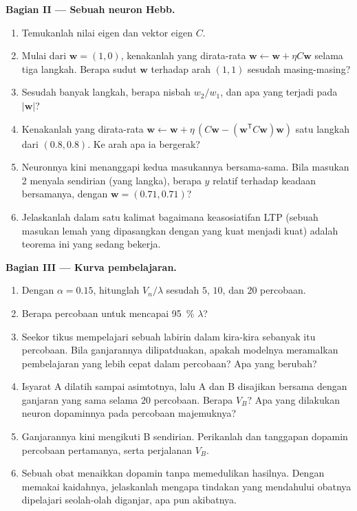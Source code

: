 \begin{problem}
\medskip
\noindent\textbf{Bagian II --- Sebuah neuron Hebb.}
\begin{enumerate}[resume]
  \item Temukanlah nilai eigen dan vektor eigen $C$.
  \item Mulai dari $\mathbf{w} = (1, 0)$, kenakanlah  yang dirata-rata
        $\mathbf{w} \leftarrow \mathbf{w} + \eta C\mathbf{w}$ selama
        tiga langkah. Berapa sudut $\mathbf{w}$ terhadap arah $(1,1)$
        sesudah masing-masing?
  \item Sesudah banyak langkah, berapa nisbah $w_{2}/w_{1}$, dan apa yang
        terjadi pada $|\mathbf{w}|$?
  \item Kenakanlah  yang dirata-rata $\mathbf{w} \leftarrow \mathbf{w} +
        \eta\,(C\mathbf{w} - (\mathbf{w}^{\mathsf{T}}C\mathbf{w})
        \mathbf{w})$ satu langkah dari $(0.8, 0.8)$. Ke arah apa
        ia bergerak?
  \item Neuronnya kini menanggapi kedua masukannya bersama-sama. Bila masukan 2
        menyala sendirian (yang langka), berapa $y$ relatif terhadap keadaan bersamanya,
        dengan $\mathbf{w} = (0.71, 0.71)$?
  \item Jelaskanlah dalam satu kalimat bagaimana keasosiatifan LTP (sebuah masukan
        lemah yang dipasangkan dengan yang kuat menjadi kuat) adalah
        teorema ini yang sedang bekerja.
\end{enumerate}

\medskip
\noindent\textbf{Bagian III --- Kurva pembelajaran.}
\begin{enumerate}[resume]
  \item Dengan $\alpha = 0.15$, hitunglah $V_{n}/\lambda$ sesudah $5$, $10$,
        dan $20$ percobaan.
  \item Berapa percobaan untuk mencapai \qty{95}{\%} $\lambda$?
  \item Seekor tikus mempelajari sebuah labirin dalam kira-kira sebanyak itu percobaan. Bila ganjarannya
        dilipatduakan, apakah modelnya meramalkan pembelajaran yang lebih cepat dalam percobaan? Apa
        yang berubah?
  \item Isyarat A dilatih sampai asimtotnya, lalu A dan B disajikan
        bersama dengan ganjaran yang sama selama $20$ percobaan. Berapa $V_{B}$?
        Apa yang dilakukan neuron dopaminnya pada percobaan majemuknya?
  \item Ganjarannya kini mengikuti B sendirian. Perikanlah  dan
        tanggapan dopamin percobaan pertamanya, serta perjalanan
        $V_{B}$.
  \item Sebuah obat menaikkan dopamin tanpa memedulikan hasilnya. Dengan memakai kaidahnya,
        jelaskanlah mengapa tindakan yang mendahului obatnya dipelajari seolah-olah
        diganjar, apa pun akibatnya.
\end{enumerate}


\end{problem}
